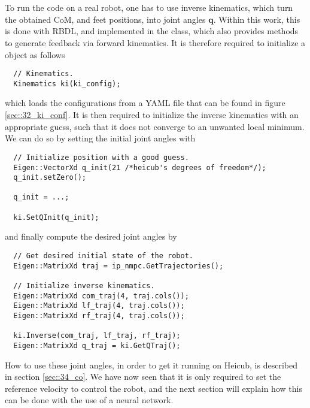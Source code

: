 \\
\\
To run the code on a real robot, one has to use inverse kinematics, which turn the obtained CoM, and feet positions, into joint angles $\bm{q}$. Within this work, this is done with RBDL, and implemented in the  class, which also provides methods to generate feedback via forward kinematics. It is therefore required to initialize a  object as follows
\begin{verbatim}
  // Kinematics.
  Kinematics ki(ki_config);
\end{verbatim}
which loads the configurations from a YAML file that can be found in figure \ref{sec::32_ki_conf}. It is then required to initialize the inverse kinematics with an appropriate guess, such that it does not converge to an unwanted local minimum. We can do so by setting the initial joint angles with
\begin{verbatim}
  // Initialize position with a good guess.
  Eigen::VectorXd q_init(21 /*heicub's degrees of freedom*/);
  q_init.setZero();

  q_init = ...;

  ki.SetQInit(q_init);
\end{verbatim}
and finally compute the desired joint angles by
\begin{verbatim}
  // Get desired initial state of the robot.
  Eigen::MatrixXd traj = ip_nmpc.GetTrajectories();

  // Initialize inverse kinematics.
  Eigen::MatrixXd com_traj(4, traj.cols());     
  Eigen::MatrixXd lf_traj(4, traj.cols());  
  Eigen::MatrixXd rf_traj(4, traj.cols());

  ki.Inverse(com_traj, lf_traj, rf_traj);
  Eigen::MatrixXd q_traj = ki.GetQTraj();
\end{verbatim}
How to use these joint angles, in order to get it running on Heicub, is described in section \ref{sec::34_co}. We have now seen that it is only required to set the reference velocity to control the robot, and the next section will explain how this can be done with the use of a neural network.
\\
